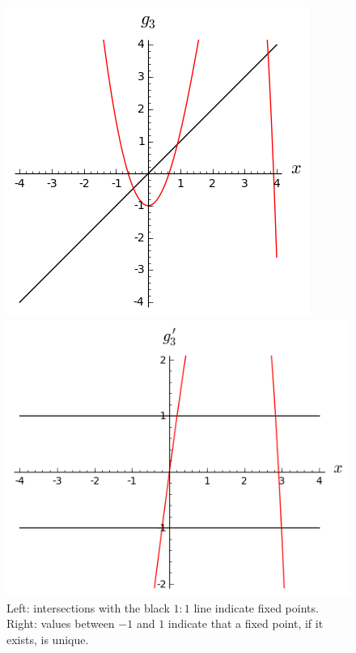 \documentclass[11pt]{article}
\begin{document}
\begin{figure}[b!]
\begin{minipage}{0.48\textwidth}
\includegraphics[width=\textwidth]{g3.png}
\end{minipage}
\begin{minipage}{0.48\textwidth}
\includegraphics[width=\textwidth]{g3p.png}
\end{minipage}
\caption{Left: intersections with the black \(1:1\) line indicate fixed points. Right: values between \(-1\) and \(1\) indicate that a fixed point, if it exists, is unique.}\label{fig::g3}
\end{figure}
\end{document}

